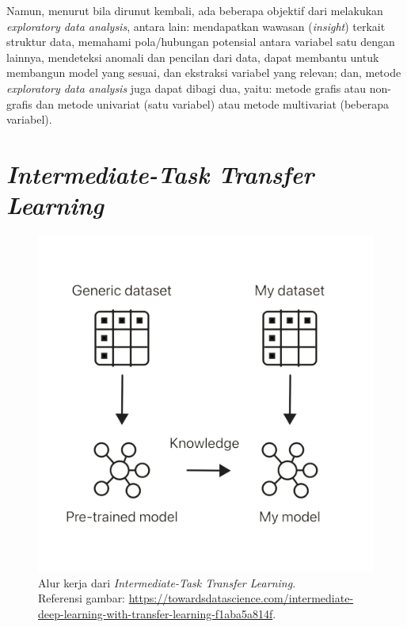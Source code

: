 Namun, menurut \citet{exploratory-data-analysis} bila dirunut kembali, ada beberapa objektif dari melakukan \emph{exploratory data analysis}, antara lain: mendapatkan wawasan (\emph{insight}) terkait struktur data, memahami pola/hubungan potensial antara variabel satu dengan lainnya, mendeteksi anomali dan pencilan dari data, dapat membantu untuk membangun model yang sesuai, dan ekstraksi variabel yang relevan; dan, metode \emph{exploratory data analysis} juga dapat dibagi dua, yaitu: metode grafis atau non-grafis dan metode univariat (satu variabel) atau metode multivariat (beberapa variabel).

\section{\emph{Intermediate-Task Transfer Learning}}

\begin{figure}[h]
\includegraphics[scale=0.5]{assets/pics/ittl.png}
\centering
\caption{Alur kerja dari \emph{Intermediate-Task Transfer Learning}.\\\hspace{\textwidth}Referensi gambar: \url{https://towardsdatascience.com/intermediate-deep-learning-with-transfer-learning-f1aba5a814f}.}
\end{figure}

